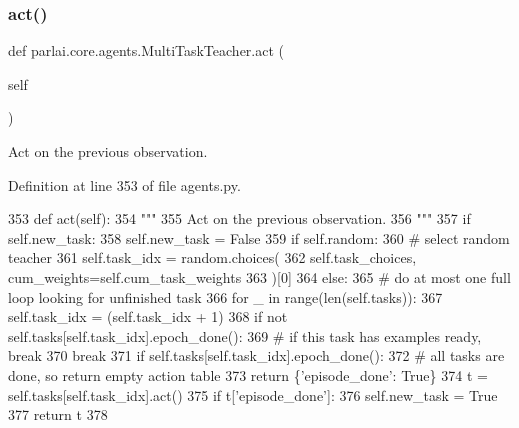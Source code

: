\subsubsection{\texorpdfstring{act()}{act()}}
{\footnotesize\ttfamily def parlai.\+core.\+agents.\+Multi\+Task\+Teacher.\+act (\begin{DoxyParamCaption}\item[{}]{self }\end{DoxyParamCaption})}

\begin{DoxyVerb}Act on the previous observation.
\end{DoxyVerb}
 

Definition at line 353 of file agents.\+py.


\begin{DoxyCode}
353     \textcolor{keyword}{def }act(self):
354         \textcolor{stringliteral}{"""}
355 \textcolor{stringliteral}{        Act on the previous observation.}
356 \textcolor{stringliteral}{        """}
357         \textcolor{keywordflow}{if} self.new\_task:
358             self.new\_task = \textcolor{keyword}{False}
359             \textcolor{keywordflow}{if} self.random:
360                 \textcolor{comment}{# select random teacher}
361                 self.task\_idx = random.choices(
362                     self.task\_choices, cum\_weights=self.cum\_task\_weights
363                 )[0]
364             \textcolor{keywordflow}{else}:
365                 \textcolor{comment}{# do at most one full loop looking for unfinished task}
366                 \textcolor{keywordflow}{for} \_ \textcolor{keywordflow}{in} range(len(self.tasks)):
367                     self.task\_idx = (self.task\_idx + 1) %
368                     \textcolor{keywordflow}{if} \textcolor{keywordflow}{not} self.tasks[self.task\_idx].epoch\_done():
369                         \textcolor{comment}{# if this task has examples ready, break}
370                         \textcolor{keywordflow}{break}
371                 \textcolor{keywordflow}{if} self.tasks[self.task\_idx].epoch\_done():
372                     \textcolor{comment}{# all tasks are done, so return empty action table}
373                     \textcolor{keywordflow}{return} \{\textcolor{stringliteral}{'episode\_done'}: \textcolor{keyword}{True}\}
374         t = self.tasks[self.task\_idx].act()
375         \textcolor{keywordflow}{if} t[\textcolor{stringliteral}{'episode\_done'}]:
376             self.new\_task = \textcolor{keyword}{True}
377         \textcolor{keywordflow}{return} t
378 
\end{DoxyCode}
\mbox{\label{classparlai_1_1core_1_1agents_1_1MultiTaskTeacher_a17444e342ab19c23cee28bba08a64df9}} 

